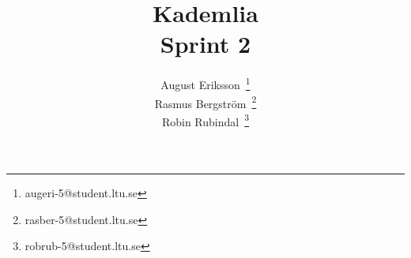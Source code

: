 \documentclass[a4paper]{article}
\title{Kademlia\\ \medskip{}
  \large{Sprint 2}
}
\author{
  August Eriksson~\thanks{augeri-5@student.ltu.se}\\
  Rasmus Bergström~\thanks{rasber-5@student.ltu.se}\\
  Robin Rubindal~\thanks{robrub-5@student.ltu.se}\\
}
\begin{document}
\maketitle
\newpage



\newpage





\newpage



\appendix{}
\newpage






\end{document}
